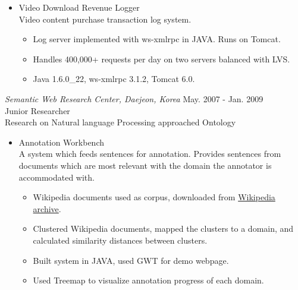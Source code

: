 \documentclass[line,margin]{res}
\begin{document}
\begin{resume}
\begin{itemize}
                     \item Video Download Revenue Logger \\ Video content purchase transaction log system.
                     \begin{itemize}
                         \item Log server implemented with ws-xmlrpc in JAVA. Runs on Tomcat.
                         \item Handles 400,000+ requests per day on two servers balanced with LVS.
                         \item Java 1.6.0\_22, ws-xmlrpc 3.1.2, Tomcat 6.0.
                     \end{itemize}
                     \end{itemize}
                    
                     {\sl Semantic Web Research Center, Daejeon, Korea} \hfill May. 2007 - Jan. 2009 \\
                     Junior Researcher \\
                     Research on Natural language Processing approached Ontology
                     \begin{itemize}  \itemsep 2pt %
                     \item Annotation Workbench \\ A system which feeds sentences for annotation.
                                                     Provides sentences from documents which are most relevant with
                                                     the domain the annotator is accommodated with.
                           \begin{itemize}
                               \item Wikipedia documents used as corpus, downloaded from
                                     \href{http://dumps.wikimedia.org/backup-index.html}{Wikipedia archive}.
                               \item Clustered Wikipedia documents, mapped the clusters to a domain,
                                     and calculated similarity distances between clusters.
                               \item Built system in JAVA, used GWT for demo webpage.
                               \item Used Treemap to visualize annotation progress of each domain.
                           \end{itemize}
                    \end{itemize}
                    

\end{resume}
\end{document}
